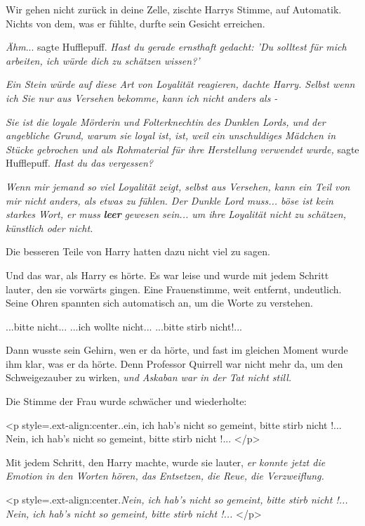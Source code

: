 \glqq Wir gehen nicht zurück in deine Zelle\grqq{}, zischte Harrys Stimme, auf
Automatik. Nichts von dem, was er fühlte, durfte sein Gesicht erreichen.

\emph{Ähm}... sagte Hufflepuff. \emph{Hast du gerade ernsthaft gedacht: 'Du
solltest für mich arbeiten, ich würde dich zu schätzen wissen?'}

\emph{Ein Stein würde auf diese Art von Loyalität reagieren, dachte Harry. Selbst wenn ich Sie nur aus Versehen bekomme, kann ich nicht anders als -}

\emph{Sie ist die loyale Mörderin und Folterknechtin des Dunklen Lords, und der
angebliche Grund, warum sie loyal ist, ist, weil ein unschuldiges Mädchen in
Stücke gebrochen und als Rohmaterial für ihre Herstellung verwendet wurde,
}sagte Hufflepuff. \emph{Hast du das vergessen?}

\emph{Wenn mir jemand so viel Loyalität zeigt, selbst aus Versehen, kann ein
Teil von mir nicht anders, als etwas zu fühlen. Der Dunkle Lord muss... böse ist
kein starkes Wort, er muss }\textbf{\emph{leer}}\emph{ gewesen sein... um ihre
Loyalität nicht zu schätzen, künstlich oder nicht.}

Die besseren Teile von Harry hatten dazu nicht viel zu sagen.

Und das war, als Harry es hörte. Es war leise und wurde mit jedem Schritt
lauter, den sie vorwärts gingen. Eine Frauenstimme, weit entfernt, undeutlich.
Seine Ohren spannten sich automatisch an, um die Worte zu verstehen.

\glqq ...bitte nicht...\grqq{} \glqq ...ich wollte nicht...\grqq{} \glqq
...bitte stirb nicht!...\grqq{}

Dann wusste sein Gehirn, wen er da hörte, und fast im gleichen Moment wurde ihm
klar, was er da hörte. Denn Professor Quirrell war nicht mehr da, um den
Schweigezauber zu wirken, \emph{und Askaban war in der Tat nicht still.}

Die Stimme der Frau wurde schwächer und wiederholte:

<p style=\grqq{}.ext-align:center\grqq{}.\grqq{}.ein, ich hab's nicht so
gemeint, bitte stirb nicht !...\grqq{} \glqq Nein, ich hab's nicht so gemeint,
bitte stirb nicht !...\grqq{} </p>

Mit jedem Schritt, den Harry machte, wurde sie lauter, \emph{er konnte jetzt die
Emotion in den Worten hören, das Entsetzen, die Reue, die Verzweiflung.}

<p style=\grqq{}.ext-align:center\grqq{}.\emph{\glqq Nein, ich hab's nicht so
gemeint, bitte stirb nicht !...\grqq{} \glqq Nein, ich hab's nicht so gemeint,
bitte stirb nicht !...\grqq{} }</p>

